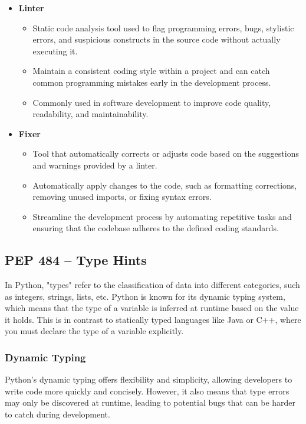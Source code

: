 \begin{itemize}
\item \textbf{Linter}
\begin{itemize}
    \item Static code analysis tool used to flag programming errors, bugs, stylistic errors, and suspicious constructs in the source code without actually executing it.
    \item Maintain a consistent coding style within a project and can catch common programming mistakes early in the development process.
    \item Commonly used in software development to improve code quality, readability, and maintainability.
\end{itemize}

\item \textbf{Fixer}
\begin{itemize}
    \item Tool that automatically corrects or adjusts code based on the suggestions and warnings provided by a linter.
    \item Automatically apply changes to the code, such as formatting corrections, removing unused imports, or fixing syntax errors.
    \item Streamline the development process by automating repetitive tasks and ensuring that the codebase adheres to the defined coding standards.
\end{itemize}
\end{itemize}


\newpage
\subsection{PEP 484 – Type Hints}
In Python, "types" refer to the classification of data into different categories, such as integers, strings, lists, etc. Python is known for its dynamic typing system, which means that the type of a variable is inferred at runtime based on the value it holds. This is in contrast to statically typed languages like Java or C++, where you must declare the type of a variable explicitly.

\subsubsection{Dynamic Typing}
Python's dynamic typing offers flexibility and simplicity, allowing developers to write code more quickly and concisely. However, it also means that type errors may only be discovered at runtime, leading to potential bugs that can be harder to catch during development.\\

